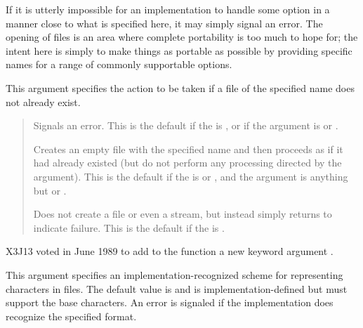 \begin{defun}[Function]
\begin{implementation}
If it is utterly impossible for an implementation to handle some option
in a manner close to what is specified here, it may simply signal an error.
The opening of files is an area where complete portability is too much to
hope for; the intent here is simply to make things as portable as possible
by providing specific names for a range of commonly supportable options.
\end{implementation}
\afternoterule

\begin{flushdesc}
\item[\cd{:if-does-not-exist}]
This argument specifies the action to be taken if
a file of the specified name does not already exist.\vadjust{\vskip2pt}
\begin{quotation}
\begin{flushdesc}
\item[\cd{:error}]
Signals an error.  This is the default if the  is ,
or if the  argument is  or .

\item[\cd{:create}]
Creates an empty file with the specified name and then proceeds as if it
had already existed (but do not perform any processing directed by the
 argument).
This is the default if the  is 
or , and the  argument is anything but 
or .

\item[\cd{\false}]
Does not create a file or even a stream, but
instead simply returns {\false} to indicate failure.
This is the default if the  is .
\end{flushdesc}
\end{quotation}
\end{flushdesc}

\newpage%

\begin{newer}
X3J13 voted in June 1989 
to add to the function  a new keyword argument .
\begin{flushdesc}
\item[\cd{:external-format}]
This argument specifies an implementation-recognized scheme for
representing characters in files.  The default value is 
and is implementation-defined but must support the base characters.
An error is signaled if the implementation does recognize the specified format.


\end{flushdesc}
\end{newer}
\end{defun}
